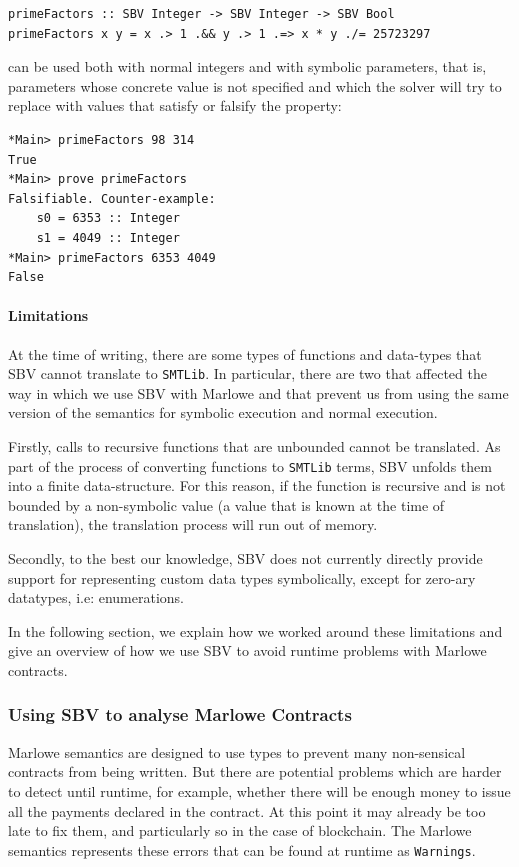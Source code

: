 \documentclass[runningheads]{llncs}
\begin{document}
\begin{verbatim}
primeFactors :: SBV Integer -> SBV Integer -> SBV Bool
primeFactors x y = x .> 1 .&& y .> 1 .=> x * y ./= 25723297
\end{verbatim}

\noindent
can be used both with normal integers and with symbolic parameters, that is, parameters whose concrete value is not specified and which the solver will try to replace with values that satisfy or falsify the property:

\begin{verbatim}
*Main> primeFactors 98 314
True
*Main> prove primeFactors
Falsifiable. Counter-example:
    s0 = 6353 :: Integer
    s1 = 4049 :: Integer
*Main> primeFactors 6353 4049
False
\end{verbatim}

\paragraph{Limitations}

At the time of writing, there are some types of functions and data-types that SBV cannot translate to \texttt{SMTLib}. In particular, there are two that affected the way in which we use SBV with Marlowe and that prevent us from using the same version of the semantics for symbolic execution and normal execution.

Firstly, calls to recursive functions that are unbounded cannot be translated. As part of the process of converting functions to \texttt{SMTLib} terms, SBV unfolds them into a finite data-structure. For this reason, if the function is recursive and is not bounded by a non-symbolic value (a value that is known at the time of translation), the translation process will run out of memory.

Secondly, to the best our knowledge, SBV does not currently directly provide support for representing custom data types symbolically, except for zero-ary datatypes, i.e: enumerations.

In the following section, we explain how we worked around these limitations and give an overview of how we use SBV to avoid runtime problems with Marlowe contracts.

\subsubsection{Using SBV to analyse Marlowe Contracts}

Marlowe semantics are designed to use types to prevent many non-sensical contracts from being written. But there are potential problems which are harder to detect until runtime, for example, whether there will be enough money to issue all the payments declared in the contract. At this point it may already be too late to fix them, and particularly so in the case of blockchain. The Marlowe semantics represents these errors that can be found at runtime as \texttt{Warnings}.
\end{document}
